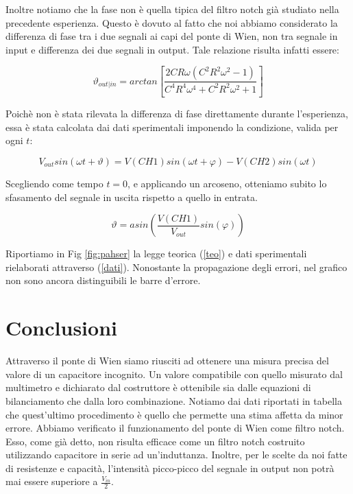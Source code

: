 \newpage
\noindent \begin{minipage}{\linewidth}
Inoltre notiamo che la fase non è quella tipica del filtro notch già studiato nella precedente esperienza. Questo è dovuto al fatto che noi abbiamo considerato la differenza di fase tra i due segnali ai capi del ponte di Wien, non tra segnale in input e differenza dei due segnali in output. Tale relazione risulta infatti essere:

\begin{equation}
\vartheta_{out|in}=arctan\left[\frac{2 C R \omega \left(C^2 R^2 \omega^2-1\right)}{C^4 R^4 \omega^4+C^2 R^2 \omega^2+1}\right]
\label{teo}
\end{equation}

Poichè non è stata rilevata la differenza di fase direttamente durante l'esperienza, essa è stata calcolata dai dati sperimentali imponendo la condizione, valida per ogni $t$:

\begin{equation}
V_{out}sin(\omega t + \vartheta)=V(CH1)sin(\omega t + \varphi)-V(CH2)sin(\omega t)
\end{equation}

Scegliendo come tempo $t=0$, e applicando un arcoseno, otteniamo subito lo sfasamento del segnale in uscita rispetto a quello in entrata.

\begin{equation}
\vartheta=asin\left(\frac{V(CH1)}{V_{out}}sin(\varphi)\right)
\label{dati}
\end{equation}


Riportiamo in Fig \ref{fig:pahser} la legge teorica (\ref{teo}) e dati sperimentali rielaborati attraverso (\ref{dati}). Nonostante la propagazione degli errori, nel grafico non sono ancora distinguibili le barre d'errore.
\end{minipage}


\section{Conclusioni}
\noindent \begin{minipage}{\linewidth}
Attraverso il ponte di Wien siamo riusciti ad ottenere una misura precisa del valore di un capacitore incognito. Un valore compatibile con quello misurato dal multimetro e dichiarato dal costruttore è ottenibile sia dalle equazioni di bilanciamento che dalla loro combinazione. Notiamo dai dati riportati in tabella che quest'ultimo procedimento è quello che permette una stima affetta da minor errore. 
Abbiamo verificato il funzionamento del ponte di Wien come filtro notch. Esso, come già detto, non risulta efficace come un filtro notch costruito utilizzando capacitore in serie ad un'induttanza. Inoltre, per le scelte da noi fatte di resistenze e capacità, l'intensità picco-picco del segnale in output non potrà mai essere superiore a $\frac{V_{in}}{2}$.
\end{minipage}

